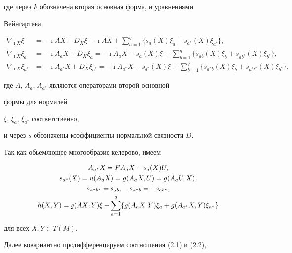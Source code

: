 где через $h$ обозначена вторая основная форма, и уравнениями


Вейнгартена


\begin{align*}


\overline \nabla_{\imath X}\xi &=


-\imath AX + D_X\xi -\imath AX +


\sum_{a=1}^q\{s_a(X)\xi_a + s_{a^*}(X)\xi_{a^*}\}, \\


\overline \nabla_{\imath X}\xi_a &= -\imath A_aX + D_X\xi_a


= -\imath A_aX - s_a(X)\xi


+ \sum_{b=1}^q\{ s_{ab}(X)\xi_b + s_{ab^*}(X)\xi_{b^*}\},\\


\overline \nabla_{\imath X}\xi_{a^*} &= -\imath A_{a^*}X + D_X\xi_{a^*}


= -\imath A_{a^*}X - s_{a^*}(X)\xi


+ \sum_{b=1}^q\{ s_{a^*b}(X)\xi_b + s_{a^*b^*}(X)\xi_{b^*} \},


\end{align*}


где  $A$, $A_a$, $A_{a^*}$ являются операторами второй основной


формы для нормалей


$\xi$, $\xi_a$, $\xi_{a^*}$ соответственно,


и через $s$ обозначены коэффициенты нормальной связности $D$.


Так как объемлющее многообразие келерово, имеем


\begin{gather}


A_{a^*}X = FA_aX - s_a(X)U, \\


s_{a^*}(X) = u(A_aX) = g(A_aX,U) = g(A_aU,X), \\


s_{a^*b^*} = s_{ab}, \quad s_{a^*b} = -s_{ab^*},\notag \\


h(X,Y) = g(AX,Y)\xi + \sum_{a=1}^q\{ g(A_aX,Y)\xi_a +


g(A_{a^*}X,Y)\xi_{a^*}\}


\end{gather}


для всех $X,Y\in T(M)$.





Далее ковариантно продифференцируем соотношения (2.1) и (2.2),


